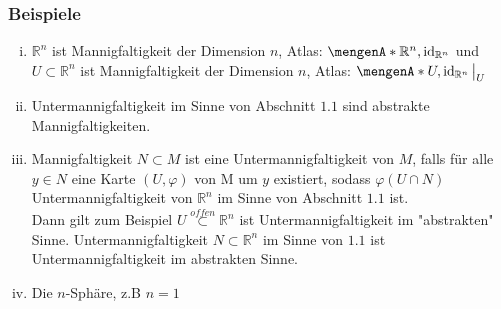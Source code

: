 \subsubsection[Beispiele für differenzierbare Mannigfaltigkeiten]{Beispiele}	
\label{ssub:115}
\begin{enumerate}[(i)]
	\item $\mathds{R}^n$ ist Mannigfaltigkeit der Dimension $n$, Atlas: $\set{\mathds{R}^n,\id_{\mathds{R}^n}}$ und $U\subset \mathds{R}^n$ ist Mannigfaltigkeit der Dimension $n$, Atlas: $\set{U,\id_{\mathds{R}^n}\big\vert_U}$
	\item Untermannigfaltigkeit im Sinne von Abschnitt $1.1$ sind abstrakte Mannigfaltigkeiten.
	\item Mannigfaltigkeit $N\subset M$ ist eine Untermannigfaltigkeit von $M$, falls für alle $y\in N$ eine Karte $(U,\varphi)$ von M um $y$ existiert, sodass $\varphi(U\cap N)$ Untermannigfaltigkeit von $\mathds{R}^n$ im Sinne von Abschnitt $1.1$ ist.\\
Dann gilt zum Beispiel $U \overset{offen}{\subset} \mathds{R}^n$ ist Untermannigfaltigkeit im "abstrakten" Sinne. Untermannigfaltigkeit $N\subset \mathds{R}^n$ im Sinne von $1.1$ ist Untermannigfaltigkeit im abstrakten Sinne.
	\item Die $n$-Sphäre, z.B $n = 1$
	\begin{figure}[H]
\end{figure}
\end{enumerate}
